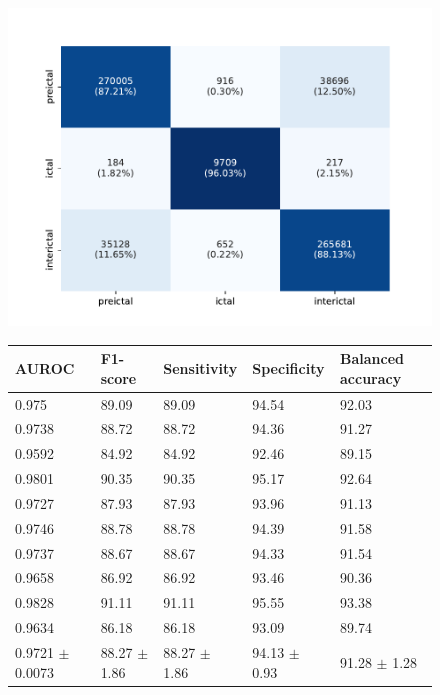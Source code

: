\documentclass[a4paper,fleqn]{cas-sc}
\begin{document}
\begin{figure}[hbt]
  \hspace*{\fill}%
  \begin{minipage}[t]{0.45\textwidth}
    \centering
    \vspace{0pt}
    \includegraphics[scale=0.45]{figures/conf_lookback_3600.pdf}
    \label{fig:conf-matrix-3600}
  \end{minipage}%
  \begin{minipage}[t]{0.55\textwidth}
  \centering
  \vspace{0pt}
    \begin{tabular}{|p{0.5in}|p{0.5in}|p{0.5in}|p{0.5in}|p{0.5in}|}
    \hline
    AUROC & F1-score & Sensitivity & Specificity & Balanced \newline accuracy \\
    \hline
    0.975 & 89.09 & 89.09 & 94.54 & 92.03 \\
    0.9738 & 88.72 & 88.72 & 94.36 & 91.27 \\
    0.9592 & 84.92 & 84.92 & 92.46 & 89.15 \\
    0.9801 & 90.35 & 90.35 & 95.17 & 92.64 \\
    0.9727 & 87.93 & 87.93 & 93.96 & 91.13 \\
    0.9746 & 88.78 & 88.78 & 94.39 & 91.58 \\
    0.9737 & 88.67 & 88.67 & 94.33 & 91.54 \\
    0.9658 & 86.92 & 86.92 & 93.46 & 90.36 \\
    0.9828 & 91.11 & 91.11 & 95.55 & 93.38 \\
    0.9634 & 86.18 & 86.18 & 93.09 & 89.74 \\
    \hline
    0.9721 \newline $\pm$ 0.0073 & 88.27 \newline $\pm$ 1.86 & 88.27 \newline $\pm$ 1.86 & 94.13 \newline $\pm$ 0.93 & 91.28 \newline $\pm$ 1.28 \\
    \hline
\end{tabular}


\end{minipage}
\end{figure}
\end{document}
